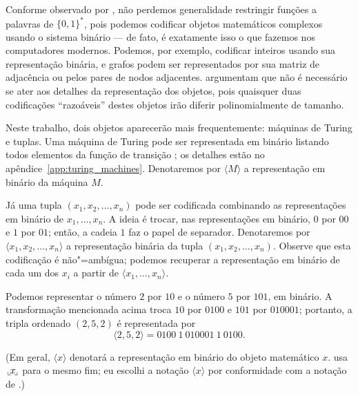 Conforme observado por ,
não perdemos generalidade restringir funções a palavras de $\{0, 1\}^*$,
pois podemos codificar objetos matemáticos complexos usando o sistema binário
--- de fato,
é exatamente isso o que fazemos nos computadores modernos.
Podemos, por exemplo,
codificar inteiros usando sua representação binária,
e grafos podem ser representados por sua matriz de adjacência
ou pelos pares de nodos adjacentes.
 argumentam que
não é necessário se ater aos detalhes da representação dos objetos,
pois quaisquer duas codificações ``razoáveis'' destes objetos
irão diferir polinomialmente de tamanho.

Neste trabalho,
dois objetos aparecerão mais frequentemente:
máquinas de Turing e tuplas.
Uma máquina de Turing pode ser representada em binário
listando todos elementos da função de transição
\cite[p.~182]{HopcroftUllman1979};
os detalhes estão no apêndice~\ref{app:turing_machines}.
Denotaremos por $\langle M \rangle$ a representação em binário da máquina $M$.

Já uma tupla $(x_1, x_2, \dots, x_n)$ pode ser codificada
combinando as representações em binário de $x_1, \dots, x_n$.
A ideia é trocar, nas representações em binário,
$0$ por $00$ e $1$ por $01$;
então, a cadeia $1$ faz o papel de separador.
Denotaremos por $\langle x_1, x_2, \dots, x_n \rangle$
a representação binária da tupla $(x_1, x_2, \dots, x_n)$.
Observe que esta codificação é não"=ambígua;
podemos recuperar a representação em binário de cada um dos $x_i$
a partir de $\langle x_1, \dots, x_n \rangle$.

\begin{example}
    Podemos representar o número $2$ por $10$ e o número $5$ por $101$,
    em binário.
    A transformação mencionada acima troca $10$ por $0100$
    e $101$ por $010001$;
    portanto, a tripla ordenado $(2, 5, 2)$ é representada por
    \begin{equation*}
        \langle 2, 5, 2 \rangle = 0100\ 1\ 010001\ 1\ 0100.
    \end{equation*}
\end{example}

(Em geral, $\langle x \rangle$ denotará a representação em binário
do objeto matemático $x$.
 usa
$\sideset{_\llcorner}{_\lrcorner}{\mathop{\makebox[0.5ex]{$x$}}}$
para o mesmo fim;
eu escolhi a notação $\langle x \rangle$
por conformidade com a notação de .)

